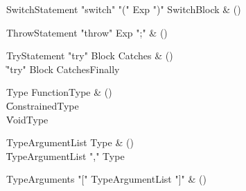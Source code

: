 \begin{bbgrammar}

SwitchStatement \label{prod:SwitchStatement}  \: \xcd"switch" \xcd"(" Exp \xcd")" SwitchBlock & () \\


\end{bbgrammar}

\begin{bbgrammar}

ThrowStatement \label{prod:ThrowStatement}  \: \xcd"throw" Exp \xcd";" & () \\


\end{bbgrammar}

\begin{bbgrammar}

TryStatement \label{prod:TryStatement}  \: \xcd"try" Block Catches & () \\

    \| \xcd"try" Block Catches\opt Finally \\

\end{bbgrammar}

\begin{bbgrammar}

Type \label{prod:Type}  \: FunctionType & () \\

    \| ConstrainedType \\
    \| VoidType \\

\end{bbgrammar}

\begin{bbgrammar}

TypeArgumentList \label{prod:TypeArgumentList}  \: Type & () \\

    \| TypeArgumentList \xcd"," Type \\

\end{bbgrammar}

\begin{bbgrammar}

TypeArguments \label{prod:TypeArguments}  \: \xcd"[" TypeArgumentList \xcd"]" & () \\


\end{bbgrammar}

